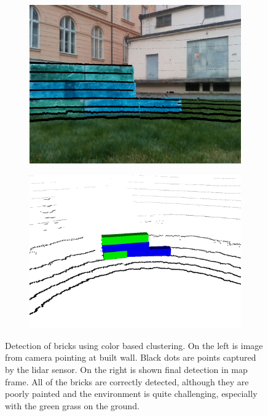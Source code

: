 \begin{figure}[H]
	
	\begin{subfigure}{0.49\textwidth}
		\centering
		\includegraphics[scale=0.2]{fig/colors_camera}
	\end{subfigure}
	\begin{subfigure}{0.49\textwidth}
		\centering
		\includegraphics[scale=0.19]{fig/colors_lidar}
	\end{subfigure}
	
	\caption[Colored pointcloud detections]{Detection of bricks using color based clustering. On the left is image from camera pointing at built wall. Black dots are points captured by the lidar sensor. On the right is shown final detection in map frame. All of the bricks are correctly detected, although they are poorly painted and the environment is quite challenging, especially with the green grass on the ground.}
	\label{fig:colors}
\end{figure}

\newpage
